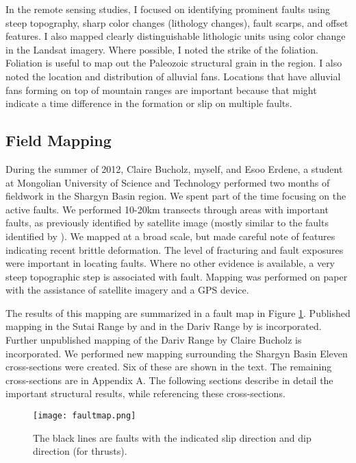 In the remote sensing studies, I focused on identifying prominent faults using steep topography, sharp color changes (lithology changes), fault scarps, and offset features. I also mapped clearly distinguishable lithologic units using color change in the Landsat imagery. Where possible, I noted the strike of the foliation. Foliation is useful to map out the Paleozoic structural grain in the region. I also noted the location and distribution of alluvial fans. Locations that have alluvial fans forming on top of mountain ranges are important because that might indicate a time difference in the formation or slip on multiple faults.

\subsection{Field Mapping}
During the summer of 2012, Claire Bucholz, myself, and Esoo Erdene, a student at Mongolian University of Science and Technology performed two months of fieldwork in the Shargyn Basin region. We spent part of the time focusing on the active faults. We performed 10-20km transects through areas with important faults, as previously identified by satellite image (mostly similar to the faults identified by \citep{Walker2007}). We mapped at a broad scale, but made careful note of features indicating recent brittle deformation. The level of fracturing and fault exposures were important in locating faults. Where no other evidence is available, a very steep topographic step is associated with fault. Mapping was performed on paper with the assistance of satellite imagery and a GPS device. 

The results of this mapping are summarized in a fault map in Figure \ref{faultmap}. Published mapping in the Sutai Range by \citet{Cunningham2003} and in the Dariv Range by \citet{Dijkstra2006} is incorporated. Further unpublished mapping of the Dariv Range by Claire Bucholz is incorporated. We performed new mapping surrounding the Shargyn Basin Eleven cross-sections were created. Six of these are shown in the text. The remaining cross-sections are in Appendix A. The following sections describe in detail the important structural results, while referencing these cross-sections.
 
\begin{figure}[h!]
  \centering
  \texttt{[image: faultmap.png]}
  \caption{The black lines are faults with the indicated slip direction and dip direction (for thrusts). }
  \label{faultmap}
\end{figure}

